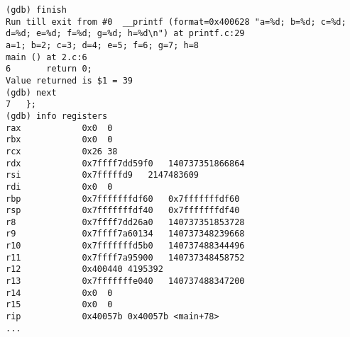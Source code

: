 \begin{lstlisting}
(gdb) finish
Run till exit from #0  __printf (format=0x400628 "a=%d; b=%d; c=%d; d=%d; e=%d; f=%d; g=%d; h=%d\n") at printf.c:29
a=1; b=2; c=3; d=4; e=5; f=6; g=7; h=8
main () at 2.c:6
6		return 0;
Value returned is $1 = 39
(gdb) next
7	};
(gdb) info registers
rax            0x0	0
rbx            0x0	0
rcx            0x26	38
rdx            0x7ffff7dd59f0	140737351866864
rsi            0x7fffffd9	2147483609
rdi            0x0	0
rbp            0x7fffffffdf60	0x7fffffffdf60
rsp            0x7fffffffdf40	0x7fffffffdf40
r8             0x7ffff7dd26a0	140737351853728
r9             0x7ffff7a60134	140737348239668
r10            0x7fffffffd5b0	140737488344496
r11            0x7ffff7a95900	140737348458752
r12            0x400440	4195392
r13            0x7fffffffe040	140737488347200
r14            0x0	0
r15            0x0	0
rip            0x40057b	0x40057b <main+78>
...
\end{lstlisting}
\fi
\fi
